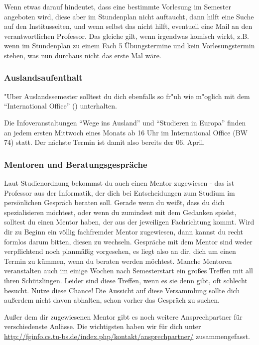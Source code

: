 Wenn etwas darauf hindeutet, dass eine bestimmte Vorlesung im Semester angeboten wird, diese aber im Stundenplan nicht auftaucht, dann hilft eine Suche auf den Institusseiten, und wenn selbst das nicht hilft, eventuell eine Mail an den verantwortlichen Professor. Das gleiche gilt, wenn irgendwas komisch wirkt, z.B. wenn im Stundenplan zu einem Fach 5 Übungstermine und kein Vorlesungstermin stehen, was nun durchaus nicht das erste Mal wäre.

\subsubsection{Auslandsaufenthalt}
"Uber Auslandssemester solltest du dich ebenfalls so fr"uh wie m"oglich mit dem "`International Office"' () unterhalten.

Die Infoveranstaltungen "`Wege ins Ausland"' und "`Studieren in Europa"' finden an jedem ersten Mittwoch eines Monats ab 16 Uhr im International Office (BW 74) statt. Der nächste Termin ist damit also bereits der 06. April.

\subsubsection{Mentoren und Beratungsgespräche}
Laut Studienordnung bekommst du auch einen Mentor zugewiesen - das ist Professor aus der Informatik, der dich bei Entscheidungen zum Studium im persönlichen Gespräch beraten soll. Gerade wenn du weißt, dass du dich spezialisieren möchtest, oder wenn du zumindest mit dem Gedanken spielst, solltest du einen Mentor haben, der aus der jeweiligen Fachrichtung kommt. Wird dir zu Beginn ein völlig fachfremder Mentor zugewiesen, dann kannst du recht formlos darum bitten, diesen zu wechseln. Gespräche mit dem Mentor sind weder verpflichtend noch planmäßig vorgesehen, es liegt also an dir, dich um einen Termin zu kümmen, wenn du beraten werden möchtest. Manche Mentoren veranstalten auch im einige Wochen nach Semesterstart ein großes Treffen mit all ihren Schützlingen.
Leider sind diese Treffen, wenn es sie denn gibt, oft schlecht besucht. Nutze diese Chance!
Die Aussicht auf diese Versammlung sollte dich außerdem nicht davon abhalten, schon vorher das Gespräch zu suchen.

Außer dem dir zugewiesenen Mentor gibt es noch weitere Ansprechpartner
für verschiedenste Anlässe. Die wichtigsten haben wir für dich unter
\url{http://fginfo.cs.tu-bs.de/index.php/kontakt/ansprechpartner/}
zusammengefasst.

